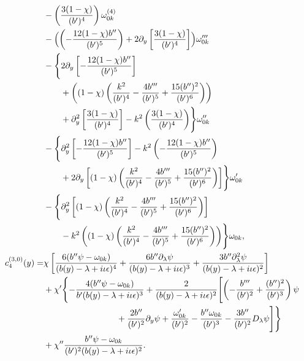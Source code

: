 \documentclass[reqno,11pt]{amsart}
\numberwithin{equation}{section}
\numberwithin{equation}{section} %
\begin{document}
\begin{enumerate}
\begin{align}
 &-\left(\frac{3(1-\chi)}{(b')^4}\right)\omega_{0k}^{(4)} \notag\\
 &-\Bigl(\left(-\frac{12(1-\chi)b''}{(b')^5}\right)+2\partial_y\left[\frac{3(1-\chi)}{(b')^4}\right]\Bigr)\omega_{0k}''' \notag\\
 &-\Biggl\{2\partial_y\left[-\frac{12(1-\chi)b''}{(b')^5}\right] \notag\\
 &\qquad+\left((1-\chi)\left(\frac{k^2}{(b')^4}-\frac{4b'''}{(b')^5}+\frac{15(b'')^2}{(b')^6}\right)\right) \notag\\
 &\qquad+\partial_y^2\left[\frac{3(1-\chi)}{(b')^4}\right]-k^2\left(\frac{3(1-\chi)}{(b')^4}\right)\Biggr\}\omega_{0k}'' \notag\\
 &-\Biggl\{\partial_y^2\left[-\frac{12(1-\chi)b''}{(b')^5}\right]-k^2\left(-\frac{12(1-\chi)b''}{(b')^5}\right) \notag\\
 &\qquad+2\partial_y\left[(1-\chi)\left(\frac{k^2}{(b')^4}-\frac{4b'''}{(b')^5}+\frac{15(b'')^2}{(b')^6}\right)\right]\Biggr\}\omega_{0k}' \notag\\
 &-\Biggl\{\partial_y^2\left[(1-\chi)\left(\frac{k^2}{(b')^4}-\frac{4b'''}{(b')^5}+\frac{15(b'')^2}{(b')^6}\right)\right] \notag\\
 &\qquad-k^2\left((1-\chi)\left(\frac{k^2}{(b')^4}-\frac{4b'''}{(b')^5}+\frac{15(b'')^2}{(b')^6}\right)\right)\Biggr\}\omega_{0k}, \notag\\
 c_4^{(3,0)}(y)=&\chi\left[
 \frac{6(b''\psi-\omega_{0k})}{(b(y)-\lambda+i\iota\epsilon)^4}
 +\frac{6b''\partial_\lambda\psi}{(b(y)-\lambda+i\iota\epsilon)^3}
 +\frac{3b''\partial_\lambda^2\psi}{(b(y)-\lambda+i\iota\epsilon)^2}\right] \notag\\
&+\chi'\Biggl\{-\frac{4(b''\psi-\omega_{0k})}{b'(b(y)-\lambda+i\iota\epsilon)^3}+\frac{2}{(b(y)-\lambda+i\iota\epsilon)^2}\Biggl[
 \left(-\frac{b'''}{(b')^2}+\frac{(b'')^2}{(b')^3}\right)\psi \notag\\
&\hspace{85pt}+\frac{2b''}{(b')^2}\partial_y\psi
 +\frac{\omega_{0k}'}{(b')^2}
 -\frac{b''\omega_{0k}}{(b')^3}
 -\frac{3b''}{(b')^2}D_\lambda\psi\Biggr]\Biggr\} \notag\\
&+\chi''\frac{b''\psi-\omega_{0k}}{(b')^2(b(y)-\lambda+i\iota\epsilon)^2}.\notag
\end{align}


\end{enumerate}
\end{document}
